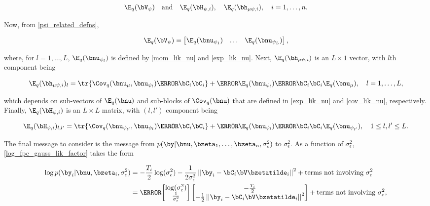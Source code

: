 \documentclass[12pt]{article}
\def\sigsqeps{\sigma^2_{\epsilon}}
\def\numu{\bnu_\mu}
\def\Vpsi{\bV_\psi}
\newcommand\nupsi[1]{\bnu_{\psi_{#1}}}
\newcommand\hmupsi[1]{\bh_{\mu \psi, i}}
\newcommand\Hpsi[1]{\bH_{\psi, i}}
\newcommand\tni[1]{\text{terms not involving $#1$}}
\theoremstyle{plain}
\theoremstyle{definition}
\theoremstyle{remark}
\begin{document}
\[
	\E_q (\Vpsi) \quad \text{and} \quad \E_q (\Hpsi{i}), \quad \E_q (\hmupsi{i}), \quad i = 1, \dots, n.
\]

\noindent Now, from \eqref{psi_related_defns},

\begin{equation}
	\E_q (\Vpsi) = \begin{bmatrix}
		\E_q (\nupsi{1}) & \dots & \E_q (\nupsi{L})
	\end{bmatrix},
\label{E_q_Vpsi}
\end{equation}

\noindent where, for $l = 1, \dots, L$, $\E_q (\nupsi{l})$ is defined by \eqref{mom_lik_nu} and \eqref{exp_lik_nu}.
Next, $\E_q (\hmupsi{i})$ is an $L \times 1$ vector, with $l$th component being

\begin{equation}
	\E_q (\hmupsi{i})_l =
		\tr \{ \Cov_q (\numu, \nupsi{l}) \T{\bC_i} \bC_i \}
		+ \T{\E_q (\nupsi{l})} \T{\bC_i} \bC_i \E_q (\numu), \quad
	l = 1, \dots, L,
\label{exp_lik_hmupsi}
\end{equation}

\noindent which depends on sub-vectors of $\E_q (\bnu)$ and sub-blocks of $\Cov_q (\bnu)$ that are defined
in \eqref{exp_lik_nu} and \eqref{cov_lik_nu}, respectively. Finally, $\E_q (\Hpsi{i})$ is an $L \times L$ matrix,
with $(l, l')$ component being

\begin{equation}
	\E_q (\Hpsi{i})_{l, l'} =
		\tr \{ \Cov_q (\nupsi{l'}, \nupsi{l}) \T{\bC_i} \bC_i \}
		+ \T{\E_q (\nupsi{l})} \T{\bC_i} \bC_i \E_q (\nupsi{l'}), \quad
	1 \le l, l' \le L.
\label{exp_lik_Hpsi}
\end{equation}

The final message to consider is the message from $p (\by | \bnu, \bzeta_1, \dots, \bzeta_n, \sigsqeps)$ to
$\sigsqeps$. As a function of $\sigsqeps$, \eqref{log_fpc_gauss_lik_factor} takes the form

\begin{align*}
	\log p (\by_i | \bnu, \bzeta_i, \sigsqeps)
		& = -\frac{T_i}{2} \log (\sigsqeps) - \frac{1}{2 \sigsqeps} \left|\left|
			\by_i - \bC_i \bV \bzetatilde_i
		\right|\right|^2 + \tni{\sigsqeps} \\
		& = \T{
			\begin{bmatrix}
				\log (\sigsqeps) \\
				\frac{1}{\sigsqeps}
			\end{bmatrix}
		} \begin{bmatrix}
			-\frac{T_i}{2} \\
			-\frac12 \left|\left| \by_i - \bC_i \bV \bzetatilde_i \right|\right|^2
		\end{bmatrix} + \tni{\sigsqeps},
\end{align*}
\end{document}
